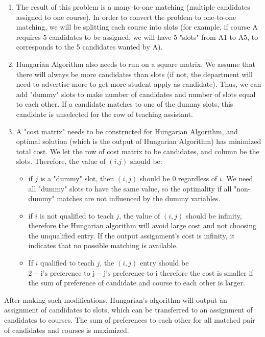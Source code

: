 \documentclass[twoside,twocolumn]{article}
\begin{document}
    \begin{enumerate}
        \item The result of this problem is a many-to-one matching (multiple candidates assigned to one course). In order to 
        convert the problem to one-to-one matching, we will be splitting each course into slots (for example, if course A
        requires 5 candidates to be assigned, we will have 5 "slots" from A1 to A5, to corresponds to the 5 candidates wanted
        by A).
        \item Hungarian Algorithm also needs to run on a square matrix. We assume that there will always be more candidates than
        slots (if not, the department will need to advertise more to get more student apply as candidate). Thus, we can add
        "dummy" slots to make number of candidates and number of slots equal to each other. If a candidate matches to one of the
        dummy slots, this candidate is unselected for the row of teaching assistant.
        \item A "cost matrix" needs to be constructed for Hungarian Algorithm, and optimal solution (which is the output of
        Hungarian Algorithm) has minimized total cost. We let the row of cost matrix to be candidates, and column be the slots.
        Therefore, the value of $(i. j)$ should be:
        \begin{itemize}
            \item if $j$ is a "dummy" slot, then $(i, j)$ should be $0$ regardless of $i$. We need all "dummy" slots to have
            the same value, so the optimality if all "non-dummy" matches are not influenced by the dummy variables.
            \item if $i$ is not qualified to teach $j$, the value of $(i, j)$ should be infinity, therefore the Hungarian algorithm
            will avoid large cost and not choosing the unqualified entry. If the output assignment's cost is infinity, it indicates
            that no possible matching is available.
            \item If $i$ qualified to teach $j$, the $(i, j)$ entry should be $2 - \text{i's preference to j} - \text{j's preference to i}$
            therefore the cost is smaller if the sum of preference of candidate and course to each other is larger.
        \end{itemize}
    \end{enumerate}
    After making such modifications, Hungarian's algorithm will output an assignment of candidates to slots, which can be
    transferred to an assignment of candidates to courses. The sum of preferences to each other for all matched pair of
    candidates and courses is maximized.
\end{document}
